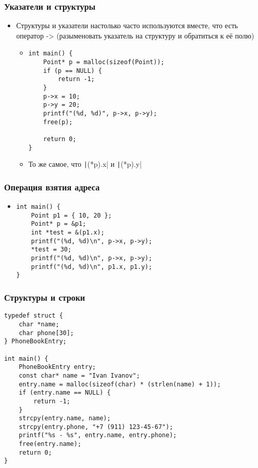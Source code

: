 \documentclass[xetex,mathserif,serif]{beamer}
\begin{document}
    \begin{frame}[fragile]
        \frametitle{Указатели и структуры}
        \begin{itemize}
            \item Структуры и указатели настолько часто используются вместе, что есть оператор -> (разыменовать указатель на структуру и обратиться к её полю)
            \begin{itemize}
                \item 
                \begin{footnotesize}
                    \begin{verbatim}
int main() {
    Point* p = malloc(sizeof(Point));
    if (p == NULL) {
        return -1;
    }
    p->x = 10;
    p->y = 20;
    printf("(%d, %d)", p->x, p->y);
    free(p);

    return 0;
}                    \end{verbatim}
                \end{footnotesize}
                \item То же самое, что \texttt|(*p).x| и \texttt|(*p).y|
            \end{itemize}
        \end{itemize}
    \end{frame}

    \begin{frame}[fragile]
        \frametitle{Операция взятия адреса}
        \begin{itemize}
            \item 
                \begin{verbatim}
int main() {
    Point p1 = { 10, 20 };
    Point* p = &p1;
    int *test = &(p1.x);
    printf("(%d, %d)\n", p->x, p->y);
    *test = 30;
    printf("(%d, %d)\n", p->x, p->y);
    printf("(%d, %d)\n", p1.x, p1.y);
}
                \end{verbatim}
        \end{itemize}
    \end{frame}

    \begin{frame}[fragile]
        \frametitle{Структуры и строки}
        \begin{footnotesize}
            \begin{verbatim}
typedef struct {
    char *name;
    char phone[30];
} PhoneBookEntry;

int main() {
    PhoneBookEntry entry;
    const char* name = "Ivan Ivanov";
    entry.name = malloc(sizeof(char) * (strlen(name) + 1));
    if (entry.name == NULL) {
        return -1;
    }
    strcpy(entry.name, name);
    strcpy(entry.phone, "+7 (911) 123-45-67");
    printf("%s - %s", entry.name, entry.phone);
    free(entry.name);
    return 0;
}
            \end{verbatim}
        \end{footnotesize}
    \end{frame}
\end{document}
